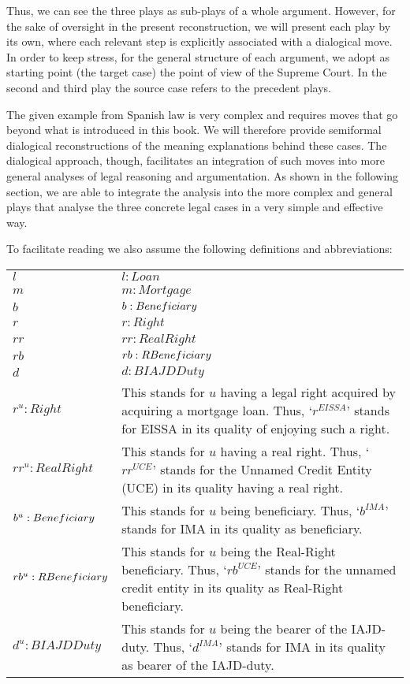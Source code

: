 			Thus, we can see the three plays as sub-plays of a whole argument. However, for the sake of oversight in the present reconstruction, we will present each play by its own, where each relevant step is explicitly associated with a dialogical move. In order to keep stress, for the general structure of each argument, we adopt as starting point (the target case) the point of view of the Supreme Court. In the second and third play the source case refers to the precedent plays.
			
			The given example from Spanish law is very complex and requires moves that go beyond what is introduced in this book. We will therefore provide semiformal dialogical reconstructions of the meaning explanations behind these cases. The dialogical approach, though, facilitates an integration of such moves into more general analyses of legal reasoning and argumentation. As shown in the following section, we are able to integrate the analysis into the more complex and general plays that analyse the three concrete legal cases in a very simple and effective way.
			
			To facilitate reading we also assume the following definitions and abbreviations:
			
			\begin{tabularx}{0.95\textwidth}{l X}
				$l$ & $l : Loan$  \\
				$m$ & $m : Mortgage$  \\
				$b$ & $b : Beneficiary\index{beneficiary}$  \\
				$r$ & $r : Right$  \\
				$rr$ & $rr : RealRight$  \\
				$rb$ & $rb : RBeneficiary\index{beneficiary}$  \\
				$d$ & $d : BIAJDDuty$  \\
				$r^u : Right$ & This stands for $u$ having a legal right acquired by acquiring a mortgage loan. Thus, ‘$r^{EISSA}$’ stands for EISSA in its quality of enjoying such a right. \\
				$rr^u : RealRight$ & This stands for $u$ having a real right. Thus, ‘$rr^{UCE}$’ stands for the Unnamed Credit Entity (UCE) in its quality having a real right.  \\
				$b^u : Beneficiary\index{beneficiary}$ & This stands for $u$ being beneficiary\index{beneficiary}. Thus, ‘$b^{IMA}$’ stands for IMA in its quality as beneficiary\index{beneficiary}. \\
				$rb^u : RBeneficiary\index{beneficiary}$ & This stands for $u$ being the Real-Right beneficiary\index{beneficiary}. Thus, ‘$rb^{UCE}$’ stands for the unnamed credit entity in its quality as Real-Right beneficiary\index{beneficiary}.  \\
				$d^u : BIAJDDuty$ & This stands for $u$ being the bearer of the IAJD-duty. Thus, ‘$d^{IMA}$’ stands for IMA in its quality as bearer of the IAJD-duty.  \\
			\end{tabularx}

